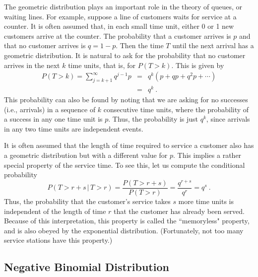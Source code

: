 \begin{example}\label{exam 5.1}
The geometric distribution plays an important role in the theory of queues, or
waiting lines.  For example, suppose a line of customers waits for service at a counter.  It
is often assumed that, in each small time unit, either 0 or 1 new customers arrive at
the counter.  The probability that a customer arrives is
$p$ and that no customer arrives is $q = 1 - p$.  Then the time $T$ until the next
arrival has a geometric distribution.  It is natural to ask for the probability
that no customer arrives in the next $k$ time units, that is, for
$P(T > k)$.  This is given by
\begin{eqnarray*} P(T > k) = \sum_{j = k+1}^\infty q^{j-1}p & = & q^k(p + qp + q^2p + \cdots)
\\
                                    & = & q^k\ .
\end{eqnarray*} This probability can also be found by noting that we are asking for no
successes (i.e., arrivals) in a sequence of $k$ consecutive time units, where the
probability of a success in any one time unit is $p$.  Thus, the probability is just
$q^k$, since arrivals in any two time units are independent events.
\par
It is often assumed that the length of time required to service a customer also has a
geometric distribution but with a different value for $p$.  This implies a rather
special property of the service time.  To see this, let us compute the conditional
probability
$$ P(T > r + s\,|\,T > r) = \frac{P(T > r + s)}{P(T > r)} = \frac {q^{r + s}}{q^r} =
q^s\ .
$$ 
Thus, the probability that the customer's service takes $s$ more time units is
independent of the length of time $r$ that the customer has already been served. 
Because of this interpretation, this property is called the ``memoryless" property,
and is also obeyed by the exponential distribution.  (Fortunately, not too many
service stations have this property.)
\end{example}

\subsection*{Negative Binomial Distribution}

